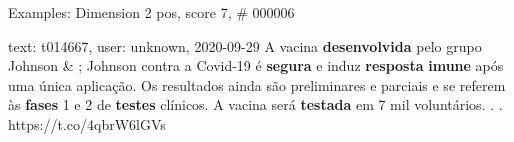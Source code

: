 \begin{frame}{Examples: Dimension 2 pos, score 7, \# 000006}
\footnotesize
\begin{exampleblock}{text: t014667, user: unknown, 2020-09-29}
A vacina \textbf{desenvolvida} pelo grupo Johnson \& ; Johnson contra a 
Covid-19 é \textbf{segura} e induz \textbf{resposta} \textbf{imune} após uma 
única aplicação. Os resultados ainda são preliminares e parciais e se referem 
às \textbf{fases} 1 e 2 de \textbf{testes} clínicos. A vacina será 
\textbf{testada} em 7 mil voluntários. . . https://t.co/4qbrW6lGVs 
\end{exampleblock}
\end{frame}
